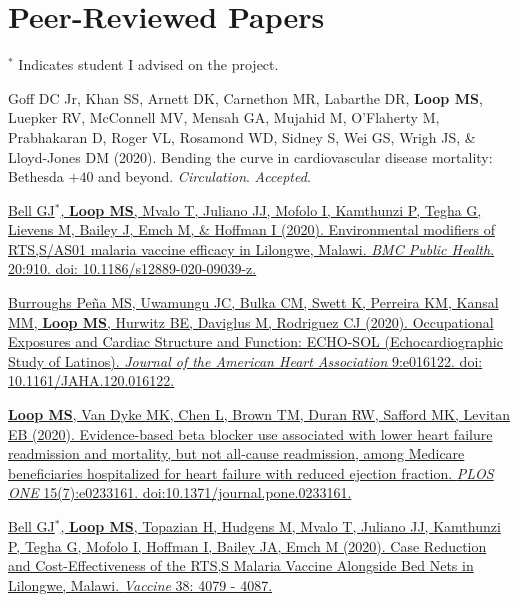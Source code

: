 \documentclass[10pt,letterpaper]{article}
\begin{document}
\section*{Peer-Reviewed Papers}

$^*$ Indicates student I advised on the project.

\begin{etaremune}
\item Goff DC Jr, Khan SS, Arnett DK, Carnethon MR, Labarthe DR, \textbf{Loop MS}, Luepker RV, McConnell MV, Mensah GA, Mujahid M, O'Flaherty M, Prabhakaran D, Roger VL, Rosamond WD, Sidney S, Wei GS, Wrigh JS, \& Lloyd-Jones DM (2020). Bending the curve in cardiovascular disease mortality: Bethesda $+40$ and beyond. \emph{Circulation}. \emph{Accepted}.

\item \href{https://bmcpublichealth.biomedcentral.com/articles/10.1186/s12889-020-09039-z}{Bell GJ$^*$, \textbf{Loop MS}, Mvalo T, Juliano JJ, Mofolo I, Kamthunzi P, Tegha G, Lievens M, Bailey J, Emch M, \& Hoffman I (2020). Environmental modifiers of RTS,S/AS01 malaria vaccine efficacy in Lilongwe, Malawi. \emph{BMC Public Health}. 20:910. doi: 10.1186/s12889-020-09039-z.}

\item \href{https://www.ahajournals.org/doi/pdf/10.1161/JAHA.120.016122}{Burroughs Pe\~{n}a MS, Uwamungu JC, Bulka CM, Swett K, Perreira KM, Kansal MM, \textbf{Loop MS}, Hurwitz BE, Daviglus M, Rodriguez CJ (2020). Occupational Exposures and Cardiac Structure and Function: ECHO-SOL (Echocardiographic Study of Latinos). \emph{Journal of the American Heart Association} 9:e016122. doi: 10.1161/JAHA.120.016122.}

\item \href{https://journals.plos.org/plosone/article?id=10.1371/journal.pone.0233161}{\textbf{Loop MS}, Van Dyke MK, Chen L, Brown TM, Duran RW, Safford MK, Levitan EB (2020). Evidence-based beta blocker use associated with lower heart failure readmission and mortality, but not all-cause readmission, among Medicare beneficiaries hospitalized for heart failure with reduced ejection fraction. \emph{PLOS ONE} 15(7):e0233161. doi:10.1371/journal.pone.0233161.}

\item \href{https://www.sciencedirect.com/science/article/pii/S0264410X20305119}{Bell GJ$^*$, \textbf{Loop MS}, Topazian H, Hudgens M, Mvalo T, Juliano JJ, Kamthunzi P, Tegha G, Mofolo I, Hoffman I, Bailey JA, Emch M (2020). Case Reduction and Cost-Effectiveness of the RTS,S Malaria Vaccine Alongside Bed Nets in Lilongwe, Malawi. \emph{Vaccine} 38: 4079 - 4087.}


\end{etaremune}
\end{document}
